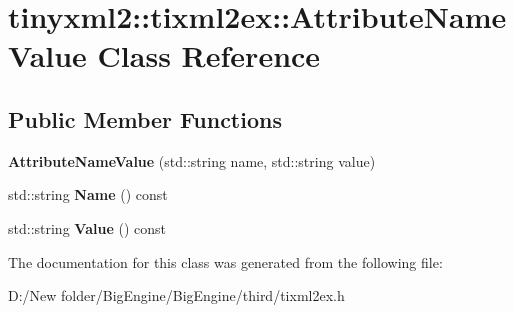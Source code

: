 \hypertarget{classtinyxml2_1_1tixml2ex_1_1_attribute_name_value}{}\section{tinyxml2\+:\+:tixml2ex\+:\+:Attribute\+Name\+Value Class Reference}
\label{classtinyxml2_1_1tixml2ex_1_1_attribute_name_value}
\subsection*{Public Member Functions}
\begin{DoxyCompactItemize}
\item 
\mbox{\label{classtinyxml2_1_1tixml2ex_1_1_attribute_name_value_ad5343404dbc48e8a91678c4ccf0f7508}} 
{\bfseries Attribute\+Name\+Value} (std\+::string name, std\+::string value)
\item 
\mbox{\label{classtinyxml2_1_1tixml2ex_1_1_attribute_name_value_a3aca6b606ea38aaea029992905492874}} 
std\+::string {\bfseries Name} () const
\item 
\mbox{\label{classtinyxml2_1_1tixml2ex_1_1_attribute_name_value_af36079fbfe9de457e118407dee7cd7af}} 
std\+::string {\bfseries Value} () const
\end{DoxyCompactItemize}


The documentation for this class was generated from the following file\+:\begin{DoxyCompactItemize}
\item 
D\+:/\+New folder/\+Big\+Engine/\+Big\+Engine/third/tixml2ex.\+h\end{DoxyCompactItemize}
